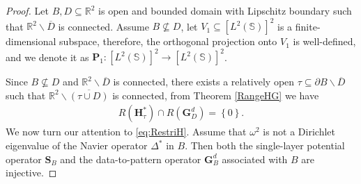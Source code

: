 \documentclass[11pt,reqno,twoside]{amsart}
\theoremstyle{definition}
\theoremstyle{remark}
\numberwithin{equation}{section}
\begin{document}
\begin{proof}
Let $B, D  \subseteq \mathbb R^2$ is open and bounded domain with Lipschitz boundary such that $\mathbb R^2 \backslash \overline {D}$ is connected. Assume $B \nsubseteq D$, let $V_1 \subseteq \left[L^{2}\left(\mathbb S\right) \right] ^2 $ is a finite-dimensional subspace, therefore, the orthogonal projection onto $V_1$ is well-defined, and we denote it as $\mathbf P_1 :\left[L^{2}\left(\mathbb S\right) \right] ^2 \to \left[L^{2}\left(\mathbb S\right) \right] ^2$. 

Since $B \nsubseteq D $ and $\mathbb R^2 \backslash \overline {D}$ is connected, there exists a relatively open $\tau \subseteq \partial B\backslash \overline{D}$ such that $\mathbb R^2 \backslash \overline {\left( \tau \cup D\right) }$ is connected, from Theorem \ref{RangeHG} we have
\begin{align}\label{eq:RangeHtG}
R\left( \mathbf H^*_{\tau} \right) \cap R\left( \mathbf G_D^d\right) =\left\lbrace 0\right\rbrace .
\end{align}
We now turn our attention to \eqref{eq:RestriH}. Assume that $\omega^2$ is not a Dirichlet eigenvalue of the Navier operator $\Delta^*$ in $B$. Then both the single-layer potential operator $\mathbf{S}_B$ and the data-to-pattern operator $\mathbf{G}_B^d$ associated with $B$ are injective.


\end{proof}
\end{document}
